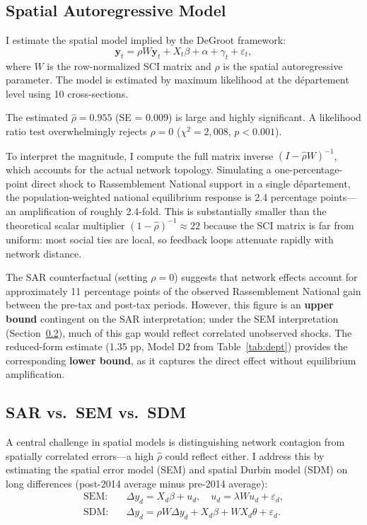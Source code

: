 \documentclass[12pt]{article}
\newcommand{\rn}{Rassemblement National}
\newcommand{\dept}{d\'{e}partement}
\begin{document}
\subsection{Spatial Autoregressive Model}

I estimate the spatial model implied by the DeGroot framework:
\begin{equation}
\mathbf{y}_t = \rho W \mathbf{y}_t + X_t \beta + \alpha + \gamma_t + \varepsilon_t,
\label{eq:sar}
\end{equation}
where $W$ is the row-normalized SCI matrix and $\rho$ is the spatial autoregressive parameter. The model is estimated by maximum likelihood at the \dept{} level using 10 cross-sections.

The estimated $\hat{\rho} = 0.955$ (SE = 0.009) is large and highly significant. A likelihood ratio test overwhelmingly rejects $\rho = 0$ ($\chi^2 = 2{,}008$, $p < 0.001$).

To interpret the magnitude, I compute the full matrix inverse $(I - \hat{\rho} W)^{-1}$, which accounts for the actual network topology. Simulating a one-percentage-point direct shock to \rn{} support in a single \dept{}, the population-weighted national equilibrium response is 2.4 percentage points---an amplification of roughly 2.4-fold. This is substantially smaller than the theoretical scalar multiplier $(1 - \hat{\rho})^{-1} \approx 22$ because the SCI matrix is far from uniform: most social ties are local, so feedback loops attenuate rapidly with network distance.

The SAR counterfactual (setting $\rho = 0$) suggests that network effects account for approximately 11 percentage points of the observed \rn{} gain between the pre-tax and post-tax periods. However, this figure is an \textbf{upper bound} contingent on the SAR interpretation; under the SEM interpretation (Section~\ref{sec:sar_sem}), much of this gap would reflect correlated unobserved shocks. The reduced-form estimate (1.35 pp, Model D2 from Table~\ref{tab:dept}) provides the corresponding \textbf{lower bound}, as it captures the direct effect without equilibrium amplification.

\subsection{SAR vs.\ SEM vs.\ SDM}
\label{sec:sar_sem}

A central challenge in spatial models is distinguishing network contagion from spatially correlated errors---a high $\hat{\rho}$ could reflect either. I address this by estimating the spatial error model (SEM) and spatial Durbin model (SDM) on long differences (post-2014 average minus pre-2014 average):
\begin{align}
\text{SEM:} \quad & \Delta y_d = X_d \beta + u_d, \quad u_d = \lambda W u_d + \varepsilon_d, \label{eq:sem} \\
\text{SDM:} \quad & \Delta y_d = \rho W \Delta y_d + X_d \beta + W X_d \theta + \varepsilon_d. \label{eq:sdm}
\end{align}
\end{document}
